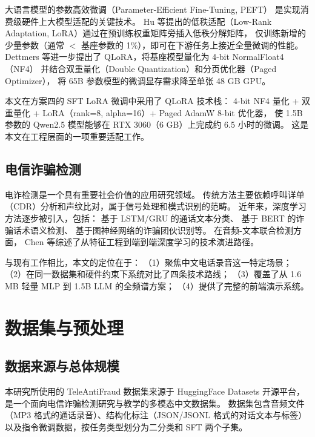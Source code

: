 \documentclass[11pt,a4paper]{ctexart}
\begin{document}
大语言模型的参数高效微调（Parameter-Efficient Fine-Tuning, PEFT）
是实现消费级硬件上大模型适配的关键技术。
Hu 等\cite{lora}提出的低秩适配（Low-Rank Adaptation, LoRA）通过在预训练权重矩阵旁插入低秩分解矩阵，
仅训练新增的少量参数（通常 $<$ 基座参数的 1\%），即可在下游任务上接近全量微调的性能。
Dettmers 等\cite{qlora}进一步提出了 QLoRA，将基座模型量化为 4-bit NormalFloat4（NF4）
并结合双重量化（Double Quantization）和分页优化器（Paged Optimizer），
将 65B 参数模型的微调显存需求降至单张 48 GB GPU。

本文在方案四的 SFT LoRA 微调中采用了 QLoRA 技术栈：
4-bit NF4 量化 + 双重量化 + LoRA（rank=8, alpha=16）+
Paged AdamW 8-bit 优化器，
使 1.5B 参数的 Qwen2.5 模型能够在 RTX 3060（6 GB）上完成约 6.5 小时的微调。
这是本文在工程层面的一项重要适配工作。

\subsection{电信诈骗检测}

电诈检测是一个具有重要社会价值的应用研究领域。
传统方法主要依赖呼叫详单（CDR）分析和声纹比对，属于信号处理和模式识别的范畴。
近年来，深度学习方法逐步被引入，包括：
基于 LSTM/GRU 的通话文本分类、
基于 BERT 的诈骗话术语义检测、
基于图神经网络的诈骗团伙识别等。
在音频-文本联合检测方面，
Chen 等\cite{audio_fraud}综述了从特征工程到端到端深度学习的技术演进路径。

与现有工作相比，本文的定位在于：
（1）聚焦中文电话录音这一特定场景；
（2）在同一数据集和硬件约束下系统对比了四条技术路线；
（3）覆盖了从 1.6 MB 轻量 MLP 到 1.5B LLM 的全频谱方案；
（4）提供了完整的前端演示系统。

\section{数据集与预处理}

\subsection{数据来源与总体规模}

本研究所使用的 TeleAntiFraud 数据集来源于 HuggingFace Datasets 开源平台，
是一个面向电信诈骗检测研究与教学的多模态中文数据集。
数据集包含音频文件（MP3 格式的通话录音）、结构化标注（JSON/JSONL 格式的对话文本与标签）
以及指令微调数据，按任务类型划分为二分类和 SFT 两个子集。
\end{document}
